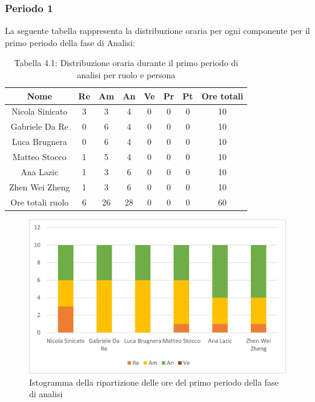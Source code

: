 \subsubsection{Periodo 1}
%
La seguente tabella rappresenta la distribuzione oraria per ogni componente per il primo periodo della fase di Analisi:
\begin{table}[h]
	\setlength\extrarowheight{5pt}
	\centering
	\begin{tabularx}{\textwidth}{|ccccccc|c|}
		\hline
		\rowcolor{white}
		\textbf{Nome} & \textbf{Re} & \textbf{Am} & \textbf{An} & \textbf{Ve} & \textbf{Pr}& \textbf{Pt} & \textbf{Ore totali} \\
		\hline
		Nicola Sinicato &3&3&4&0&0&0&10 \\
		Gabriele Da Re &0&6&4&0&0&0&10 \\
		Luca Brugnera &0&6&4&0&0&0&10 \\
		Matteo Stocco &1&5&4&0&0&0&10 \\
		Ana Lazic &1&3&6&0&0&0&10 \\
		Zhen Wei Zheng &1&3&6&0&0&0&10 \\
		\hline
		Ore totali ruolo &6&26&28&0&0&0&60 \\
		\hline
	\end{tabularx}
	\vspace{10pt}
	\caption{Tabella 4.1: Distribuzione oraria durante il primo periodo di analisi per ruolo e persona}
\end{table}
\begin{figure}[H]
    \centering
    \includegraphics[scale=0.6]{img/grafi preventivo/istogrammi/analisi/periodo1.png}
    \caption{Istogramma della ripartizione delle ore del primo periodo della fase di analisi}
\end{figure}
